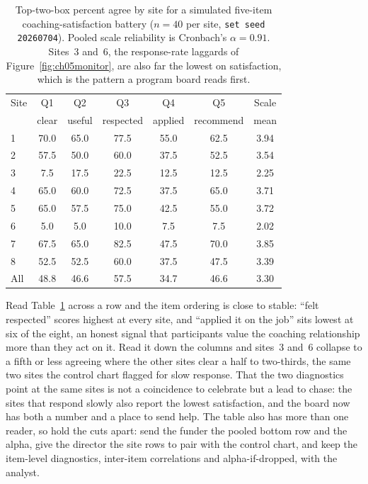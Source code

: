 \documentclass[
    a4paper,
    fontsize=10pt,
    twoside=true,
    numbers=noenddot,
]{kaobook}
\begin{document}
\begin{table}[htbp]
\centering
\caption[Percent agree by site, simulated coaching battery]{Top-two-box percent agree by site for a simulated five-item coaching-satisfaction battery ($n=40$ per site, \texttt{set seed 20260704}). Pooled scale reliability is Cronbach's $\alpha=0.91$. Sites~3 and~6, the response-rate laggards of Figure~\ref{fig:ch05monitor}, are also far the lowest on satisfaction, which is the pattern a program board reads first.}
\label{tab:ch05agree}
{\footnotesize
\begin{tabular}{lcccccc}
\hline
Site & Q1 & Q2 & Q3 & Q4 & Q5 & Scale \\
     & clear & useful & respected & applied & recommend & mean \\
\hline
1 & 70.0 & 65.0 & 77.5 & 55.0 & 62.5 & 3.94 \\
2 & 57.5 & 50.0 & 60.0 & 37.5 & 52.5 & 3.54 \\
3 &  7.5 & 17.5 & 22.5 & 12.5 & 12.5 & 2.25 \\
4 & 65.0 & 60.0 & 72.5 & 37.5 & 65.0 & 3.71 \\
5 & 65.0 & 57.5 & 75.0 & 42.5 & 55.0 & 3.72 \\
6 &  5.0 &  5.0 & 10.0 &  7.5 &  7.5 & 2.02 \\
7 & 67.5 & 65.0 & 82.5 & 47.5 & 70.0 & 3.85 \\
8 & 52.5 & 52.5 & 60.0 & 37.5 & 47.5 & 3.39 \\
\hline
All & 48.8 & 46.6 & 57.5 & 34.7 & 46.6 & 3.30 \\
\hline
\end{tabular}
}
\end{table}

Read Table~\ref{tab:ch05agree} across a row and the item ordering is close to stable: \enquote{felt respected} scores highest at every site, and \enquote{applied it on the job} sits lowest at six of the eight, an honest signal that participants value the coaching relationship more than they act on it. Read it down the columns and sites~3 and~6 collapse to a fifth or less agreeing where the other sites clear a half to two-thirds, the same two sites the control chart flagged for slow response. That the two diagnostics point at the same sites is not a coincidence to celebrate but a lead to chase: the sites that respond slowly also report the lowest satisfaction, and the board now has both a number and a place to send help. The table also has more than one reader, so hold the cuts apart: send the funder the pooled bottom row and the alpha, give the director the site rows to pair with the control chart, and keep the item-level diagnostics, inter-item correlations and alpha-if-dropped, with the analyst.
\end{document}
